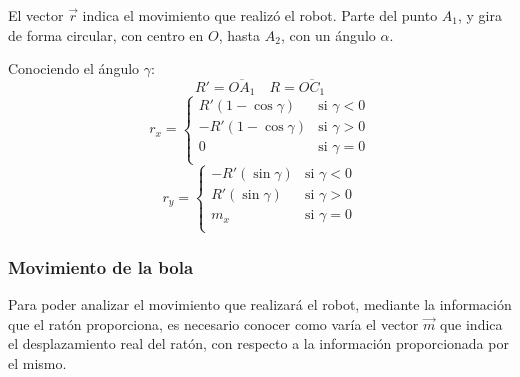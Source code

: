 \documentclass[10pt,a4paper,hidelinks,twocolumn]{article}
\begin{document}
\begin{center}
\end{center}

El vector $\vec{r}$ indica el movimiento que realizó el robot. Parte del punto 
$A_1$, y gira de forma circular, con centro en $O$, hasta $A_2$, con un ángulo 
$\alpha$.

Conociendo el ángulo $\gamma$:
$$ R' = \overline{OA_1} \quad R = \overline{OC_1} $$
$$
r_x = \begin{cases}
		R'(1-\cos \gamma) & \text{si } \gamma < 0\\
		-R'(1-\cos \gamma) & \text{si } \gamma > 0\\
		0 & \text{si } \gamma = 0\\
	\end{cases}
$$
$$
r_y = \begin{cases}
		-R'(\sin \gamma) & \text{si } \gamma < 0\\
		R'(\sin \gamma) & \text{si } \gamma > 0\\
		m_x & \text{si } \gamma = 0\\
	\end{cases}
$$
\subsubsection{Movimiento de la bola}
Para poder analizar el movimiento que realizará el robot, mediante la 
información que el ratón proporciona, es necesario conocer como varía el vector 
$\vec{m}$ que indica el desplazamiento real del ratón, con respecto a la 
información proporcionada por el mismo.
\end{document}
